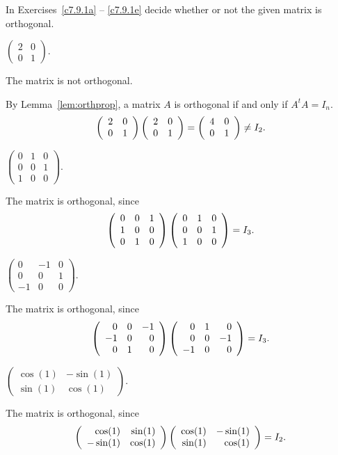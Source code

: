 \documentclass{ximera}
\begin{document}
\noindent In Exercises~\ref{c7.9.1a} -- \ref{c7.9.1e} decide whether or not
the given matrix is orthogonal.
\begin{exercise} \label{c7.9.1a}
$\left(\begin{array}{rr} 2 & 0\\ 0 & 1\end{array}\right)$.

\begin{solution}
\ans The matrix is not orthogonal.

\soln By Lemma~\ref{lem:orthprop}, a matrix
$A$ is orthogonal if and only if $A^tA = I_n$.
\[
\left(\begin{array}{rr} 2 & 0\\ 0 &1\end{array}\right)\left(\begin{array}{rr} 2 & 0\\ 0 &1\end{array}\right) = \left(\begin{array}{rr} 4 & 0\\ 0 &1\end{array}\right) \neq I_2.
\]

\end{solution}
\end{exercise}
\begin{exercise} \label{c7.9.1b}
$\left(\begin{array}{rrr} 0 & 1 & 0\\ 0 & 0 & 1\\
1 & 0 & 0\end{array}\right)$.

\begin{solution}
\ans The matrix is orthogonal, since
\[
\left(\begin{array}{rrr} 0 & 0 & 1 \\ 1 & 0 & 0 \\ 0 & 1 & 0\end{array}\right)
\left(\begin{array}{rrr} 0 & 1 & 0 \\ 0 & 0 & 1 \\ 1 & 0 & 0\end{array}\right) =
I_3.
\]

\end{solution}
\end{exercise}
\begin{exercise} \label{c7.9.1c}
$\left(\begin{array}{rrr} 0 & -1 & 0\\ 0 & 0 & 1\\
-1 & 0 & 0\end{array}\right)$.

\begin{solution}
The matrix is orthogonal, since
\[
\left(\begin{array}{rrr} 0 & 0 & -1 \\ -1 & 0 & 0 \\ 0 & 1 & 0\end{array}\right)
\left(\begin{array}{rrr} 0 & 1 & 0 \\ 0 & 0 & -1 \\ -1 & 0 & 0\end{array}\right) =
I_3.
\]

\end{solution}
\end{exercise}
\begin{exercise} \label{c7.9.1d}
$\left(\begin{array}{rr} \cos(1) & -\sin(1)\\ \sin(1) & \cos(1)
\end{array}\right)$.

\begin{solution}
The matrix is orthogonal, since
\[
\left(\begin{array}{rr} \cos(1) & \sin(1)\\ -\sin(1) &\cos(1)\end{array}\right)
\left(\begin{array}{rr} \cos(1) & -\sin(1)\\ \sin(1) &\cos(1)\end{array}\right)
= I_2.
\]

\end{solution}
\end{exercise}
\end{document}
